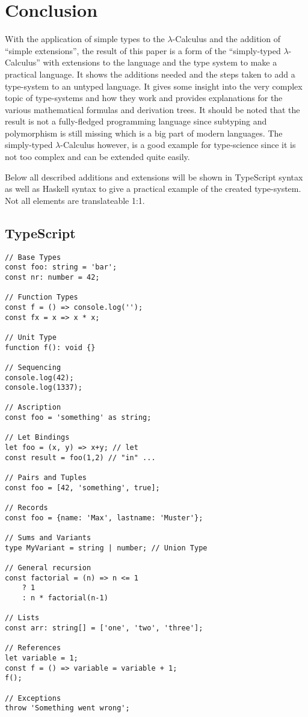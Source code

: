 \section{Conclusion}

With the application of simple types to the $\lambda$-Calculus
and the addition of ``simple extensions'', the result of this paper
is a form of the ``simply-typed $\lambda$-Calculus'' with extensions to
the language and the type system to make a practical language. It shows
the additions needed and the steps taken to add a type-system to an
untyped language. It gives some insight into the very complex topic
of type-systems and how they work and provides explanations for the
various mathematical formulas and derivation trees. It should be
noted that the result is not a fully-fledged programming language since
subtyping and polymorphism is still missing which is a big part of
modern languages. The simply-typed $\lambda$-Calculus however, is
a good example for type-science since it is not too complex and
can be extended quite easily.

Below all described additions and extensions will be shown in
TypeScript syntax as well as Haskell syntax to give a practical
example of the created type-system. Not all elements are
translateable 1:1.

\subsection*{TypeScript}

\begin{verbatim}
// Base Types
const foo: string = 'bar';
const nr: number = 42;

// Function Types
const f = () => console.log('');
const fx = x => x * x;

// Unit Type
function f(): void {}

// Sequencing
console.log(42);
console.log(1337);

// Ascription
const foo = 'something' as string;

// Let Bindings
let foo = (x, y) => x+y; // let
const result = foo(1,2) // "in" ...

// Pairs and Tuples
const foo = [42, 'something', true];

// Records
const foo = {name: 'Max', lastname: 'Muster'};

// Sums and Variants
type MyVariant = string | number; // Union Type

// General recursion
const factorial = (n) => n <= 1
    ? 1
    : n * factorial(n-1)

// Lists
const arr: string[] = ['one', 'two', 'three'];

// References
let variable = 1;
const f = () => variable = variable + 1;
f();

// Exceptions
throw 'Something went wrong';
\end{verbatim}

